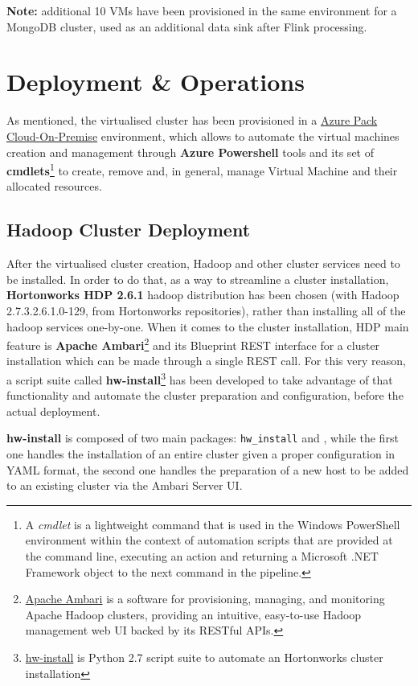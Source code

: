 \textbf{Note:} additional 10 VMs have been provisioned in the same environment for a MongoDB cluster, used as an additional data sink after Flink processing.

\section{Deployment \& Operations}

As mentioned, the virtualised cluster has been provisioned in a \href{https://www.microsoft.com/it-it/cloud-platform/windows-azure-pack}{Azure Pack Cloud-On-Premise} environment, which allows to automate the virtual machines creation and management through \textbf{Azure Powershell} tools and its set of \textbf{cmdlets}\footnote{A \textit{cmdlet} is a lightweight command that is used in the Windows PowerShell environment within the context of automation scripts that are provided at the command line, executing an action and returning a Microsoft .NET Framework object to the next command in the pipeline.} to create, remove and, in general, manage Virtual Machine and their allocated resources.

\subsection{Hadoop Cluster Deployment}

After the virtualised cluster creation, Hadoop and other cluster services need to be installed. In order to do that, as a way to streamline a cluster installation, \textbf{Hortonworks HDP 2.6.1} hadoop distribution has been chosen (with Hadoop 2.7.3.2.6.1.0-129, from Hortonworks repositories), rather than installing all of the hadoop services one-by-one. When it comes to the cluster installation, HDP main feature is \textbf{Apache Ambari}\footnote{\href{https://ambari.apache.org/}{Apache Ambari} is a software for provisioning, managing, and monitoring Apache Hadoop clusters, providing an intuitive, easy-to-use Hadoop management web UI backed by its RESTful APIs.} and its Blueprint REST interface for a cluster installation which can be made through a single REST call. For this very reason, a script suite called \textbf{hw-install}\footnote{\href{https://github.com/fedexist/hw-install}{hw-install} is Python 2.7 script suite to automate an Hortonworks cluster installation} has been developed to take advantage of that functionality and automate the cluster preparation and configuration, before the actual deployment.

\textbf{hw-install} is composed of two main packages: \texttt{hw\_install} and \texttt{}, while the first one handles the installation of an entire cluster given a proper configuration in YAML format, the second one handles the preparation of a new host to be added to an existing cluster via the Ambari Server UI.

